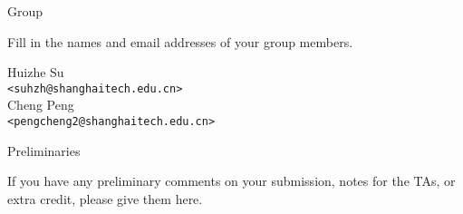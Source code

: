 


\begin{titlepage} %

  \begin{center}
  \end{center}
  \vfill %

  \begin{aspect}{Group}
    \begin{tcolorbox}
      \large
      Fill in the names and email addresses of your group members.
    \end{tcolorbox}
    \centering
    \large
    \vspace{0.1cm}
    Huizhe Su\\
    \texttt{<suhzh@shanghaitech.edu.cn>}\\
    Cheng Peng\\
    \texttt{<pengcheng2@shanghaitech.edu.cn>}
  \end{aspect}

  \begin{aspect}{Preliminaries}
    \begin{tcolorbox}
      If you have any preliminary comments on your submission, notes for the
      TAs, or extra credit, please give them here.


\end{tcolorbox}
\end{aspect}
\end{titlepage}
